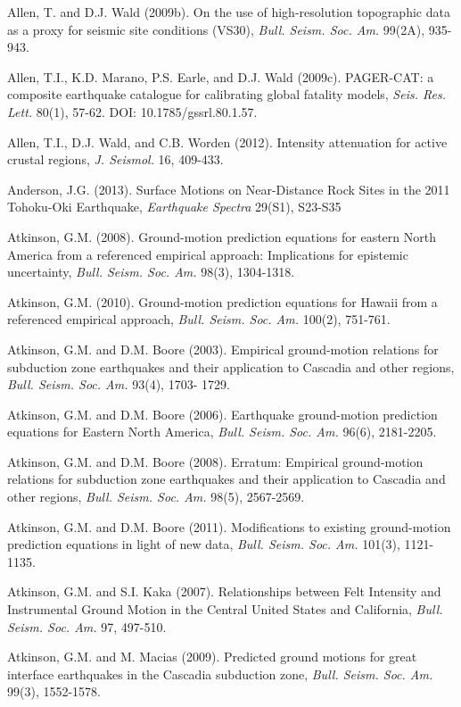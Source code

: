 \documentclass[letterpaper,10pt,english]{sphinxmanual}
\begin{document}
\label{references:allen2009b}
Allen, T. and D.J. Wald (2009b). On the use of high-resolution topographic data as a proxy for seismic
site conditions (VS30), \emph{Bull. Seism. Soc. Am.} 99(2A), 935-943.

Allen, T.I., K.D. Marano, P.S. Earle, and D.J. Wald (2009c). PAGER-CAT: a composite earthquake
catalogue for calibrating global fatality models, \emph{Seis. Res. Lett.} 80(1), 57-62.
DOI: 10.1785/gssrl.80.1.57.

\label{references:allen2012}
Allen, T.I., D.J. Wald, and C.B. Worden (2012). Intensity attenuation for active crustal regions, \emph{J.
Seismol.} 16, 409-433.

Anderson, J.G. (2013). Surface Motions on Near-Distance Rock Sites in the 2011 Tohoku-Oki Earthquake,
\emph{Earthquake Spectra} 29(S1), S23-S35

Atkinson, G.M. (2008). Ground-motion prediction equations for eastern North America from a referenced
empirical approach: Implications for epistemic uncertainty, \emph{Bull. Seism. Soc. Am.} 98(3), 1304-1318.

Atkinson, G.M. (2010). Ground-motion prediction equations for Hawaii from a referenced empirical
approach, \emph{Bull. Seism. Soc. Am.} 100(2), 751-761.

Atkinson, G.M. and D.M. Boore (2003). Empirical ground-motion relations for subduction zone
earthquakes and their application to Cascadia and other regions, \emph{Bull. Seism. Soc. Am.} 93(4), 1703-
1729.

Atkinson, G.M. and D.M. Boore (2006). Earthquake ground-motion prediction equations for Eastern North
America, \emph{Bull. Seism. Soc. Am.} 96(6), 2181-2205.

Atkinson, G.M. and D.M. Boore (2008). Erratum: Empirical ground-motion relations for subduction zone
earthquakes and their application to Cascadia and other regions, \emph{Bull. Seism. Soc. Am.} 98(5), 2567-2569.

Atkinson, G.M. and D.M. Boore (2011). Modifications to existing ground-motion prediction equations in
light of new data, \emph{Bull. Seism. Soc. Am.} 101(3), 1121-1135.

\label{references:atkinson2007}
Atkinson, G.M. and S.I. Kaka (2007). Relationships between Felt Intensity and Instrumental Ground
Motion in the Central United States and California, \emph{Bull. Seism. Soc. Am.} 97, 497-510.

Atkinson, G.M. and M. Macias (2009). Predicted ground motions for great interface earthquakes in the
Cascadia subduction zone, \emph{Bull. Seism. Soc. Am.} 99(3), 1552-1578.
\end{document}
